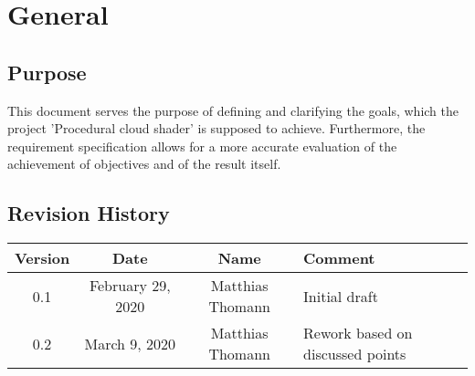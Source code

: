 \section{General}

\subsection{Purpose}
This document serves the purpose of defining and clarifying the goals, which the project 'Procedural cloud shader' is supposed to achieve. Furthermore, the requirement specification allows for a more accurate evaluation of the achievement of objectives and of the result itself.

\subsection{Revision History}

\begin{tabularx}{\textwidth}{|c|c|c|X|}
    \hline
    Version & Date & Name & Comment \\ \hline
    0.1 & February 29, 2020 & Matthias Thomann & Initial draft \\ \hline
    0.2 & March 9, 2020 & Matthias Thomann & Rework based on discussed points \\ \hline
\end{tabularx}
